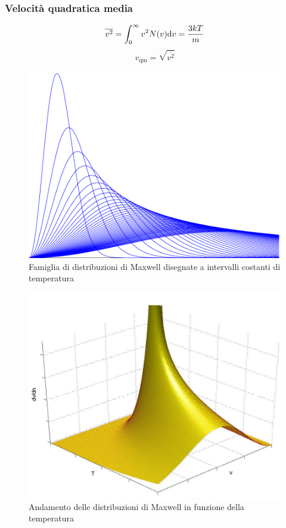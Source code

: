 \subsubsection{Velocità quadratica media}
\begin{equation}
\overline{v^2}=\int_0^\infty v^2N(v)\mathrm{d} v=\frac{3kT}{m}
\end{equation}
\begin{equation*}v_\text{qm}=\sqrt{\overline{v^2}}\end{equation*}



\begin{figure}[htbp]
\centering
\includegraphics[scale=0.7]{immagini/fisica1/maxwell_famiglia2}
\caption{Famiglia di distribuzioni di Maxwell disegnate a intervalli costanti di temperatura}
\end{figure}

\begin{figure}[htbp]
\centering
\includegraphics[scale=0.8]{immagini/fisica1/maxwell3d}
\caption{Andamento delle distribuzioni di Maxwell in funzione della temperatura}
\end{figure}


